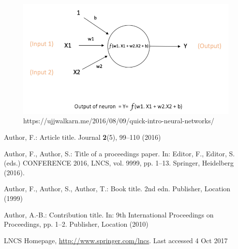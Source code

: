 \documentclass[runningheads]{llncs}
\begin{document}
\begin{figure}
\includegraphics[height=6cm]{neuron}
\caption{https://ujjwalkarn.me/2016/08/09/quick-intro-neural-networks/}
\end{figure}
%
%
%
% 
% 
%
\begin{thebibliography}{8}
Author, F.: Article title. Journal \textbf{2}(5), 99--110 (2016)

Author, F., Author, S.: Title of a proceedings paper. In: Editor,
F., Editor, S. (eds.) CONFERENCE 2016, LNCS, vol. 9999, pp. 1--13.
Springer, Heidelberg (2016). 

Author, F., Author, S., Author, T.: Book title. 2nd edn. Publisher,
Location (1999)

Author, A.-B.: Contribution title. In: 9th International Proceedings
on Proceedings, pp. 1--2. Publisher, Location (2010)

LNCS Homepage, \url{http://www.springer.com/lncs}. Last accessed 4
Oct 2017
\end{thebibliography}
\end{document}
